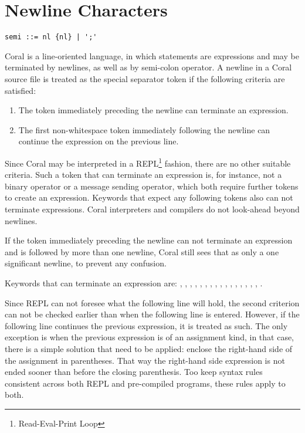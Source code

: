 \section{Newline Characters}
\label{sec:newlinecharacters}

\syntax\begin{lstlisting}
semi ::= nl {nl} | ';'
\end{lstlisting}

Coral is a line-oriented language, in which statements are expressions and may be terminated by newlines, as well as by semi-colon operator. A newline in a Coral source file is treated as the special separator token \lstinline@nl@ if the following criteria are satisfied:

\begin{enumerate}
\item The token immediately preceding the newline can terminate an expression.
\item The first non-whitespace token immediately following the newline can continue the expression on the previous line. 
\end{enumerate}

Since Coral may be interpreted in a REPL\footnote{Read-Eval-Print Loop} fashion, there are no other suitable criteria. Such a token that can terminate an expression is, for instance, not a binary operator or a message sending operator, which both require further tokens to create an expression. Keywords that expect any following tokens also can not terminate expressions. Coral interpreters and compilers do not look-ahead beyond newlines.

If the token immediately preceding the newline can not terminate an expression and is followed by more than one newline, Coral still sees that as only a one significant newline, to prevent any confusion.

Keywords that can terminate an expression are: \lstinline@break@, \lstinline@end@, \lstinline@opaque@, \lstinline@native@, \lstinline@next@, \lstinline@nil@, \lstinline@no@, \lstinline@redo@, \lstinline@retry@, \lstinline@return@, \lstinline@self@, \lstinline@skip@, \lstinline@super@, \lstinline@this@, \lstinline@transparent@, \lstinline@yes@, \lstinline@yield@.

Since REPL can not foresee what the following line will hold, the second criterion can not be checked earlier than when the following line is entered. However, if the following line continues the previous expression, it is treated as such. The only exception is when the previous expression is of an assignment kind, in that case, there is a simple solution that need to be applied: enclose the right-hand side of the assignment in parentheses. That way the right-hand side expression is not ended sooner than before the closing parenthesis. Too keep syntax rules consistent across both REPL and pre-compiled programs, these rules apply to both. 

